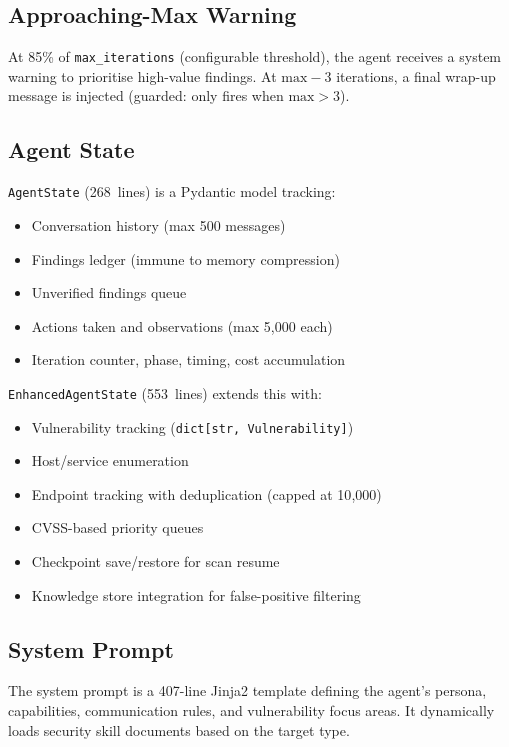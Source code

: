 \documentclass[11pt,a4paper]{article}
\begin{document}
\subsection{Approaching-Max Warning}
At 85\% of \texttt{max\_iterations} (configurable threshold), the agent receives a
system warning to prioritise high-value findings. At $\text{max}-3$ iterations, a
final wrap-up message is injected (guarded: only fires when $\text{max} > 3$).

\subsection{Agent State}
\texttt{AgentState} (268~lines) is a Pydantic model tracking:
\begin{itemize}[noitemsep]
  \item Conversation history (max 500 messages)
  \item Findings ledger (immune to memory compression)
  \item Unverified findings queue
  \item Actions taken and observations (max 5{,}000 each)
  \item Iteration counter, phase, timing, cost accumulation
\end{itemize}

\texttt{EnhancedAgentState} (553~lines) extends this with:
\begin{itemize}[noitemsep]
  \item Vulnerability tracking (\texttt{dict[str, Vulnerability]})
  \item Host/service enumeration
  \item Endpoint tracking with deduplication (capped at 10{,}000)
  \item CVSS-based priority queues
  \item Checkpoint save/restore for scan resume
  \item Knowledge store integration for false-positive filtering
\end{itemize}

\subsection{System Prompt}
The system prompt is a 407-line Jinja2 template defining the agent's persona,
capabilities, communication rules, and vulnerability focus areas. It dynamically
loads security skill documents based on the target type.
\end{document}
